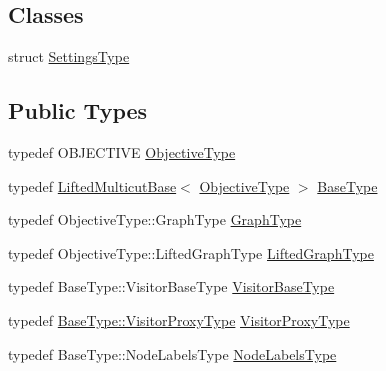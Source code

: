 \subsection*{Classes}
\begin{DoxyCompactItemize}
\item 
struct \hyperlink{structnifty_1_1graph_1_1opt_1_1lifted__multicut_1_1LiftedMulticutAndresGreedyAdditive_1_1SettingsType}{Settings\+Type}
\end{DoxyCompactItemize}
\subsection*{Public Types}
\begin{DoxyCompactItemize}
\item 
typedef O\+B\+J\+E\+C\+T\+I\+VE \hyperlink{classnifty_1_1graph_1_1opt_1_1lifted__multicut_1_1LiftedMulticutAndresGreedyAdditive_a17071365067415acd658d848f37f361a}{Objective\+Type}
\item 
typedef \hyperlink{classnifty_1_1graph_1_1opt_1_1lifted__multicut_1_1LiftedMulticutBase}{Lifted\+Multicut\+Base}$<$ \hyperlink{classnifty_1_1graph_1_1opt_1_1lifted__multicut_1_1LiftedMulticutAndresGreedyAdditive_a17071365067415acd658d848f37f361a}{Objective\+Type} $>$ \hyperlink{classnifty_1_1graph_1_1opt_1_1lifted__multicut_1_1LiftedMulticutAndresGreedyAdditive_ae2994c90119318204fc5aa7aa6421e0d}{Base\+Type}
\item 
typedef Objective\+Type\+::\+Graph\+Type \hyperlink{classnifty_1_1graph_1_1opt_1_1lifted__multicut_1_1LiftedMulticutAndresGreedyAdditive_ad623734a6fd0e6fcebdd84d8764003ce}{Graph\+Type}
\item 
typedef Objective\+Type\+::\+Lifted\+Graph\+Type \hyperlink{classnifty_1_1graph_1_1opt_1_1lifted__multicut_1_1LiftedMulticutAndresGreedyAdditive_afbbf999f5df5dfc1ed3cd8f3f296bf18}{Lifted\+Graph\+Type}
\item 
typedef Base\+Type\+::\+Visitor\+Base\+Type \hyperlink{classnifty_1_1graph_1_1opt_1_1lifted__multicut_1_1LiftedMulticutAndresGreedyAdditive_aaec5054a53fdbf048b7e2b63959db03e}{Visitor\+Base\+Type}
\item 
typedef \hyperlink{classnifty_1_1graph_1_1opt_1_1common_1_1SolverBase_ad209b469b3bc9fc0fc14e9fed4d09075}{Base\+Type\+::\+Visitor\+Proxy\+Type} \hyperlink{classnifty_1_1graph_1_1opt_1_1lifted__multicut_1_1LiftedMulticutAndresGreedyAdditive_a6b35ea13bacfe0442cc6bcca83517c7c}{Visitor\+Proxy\+Type}
\item 
typedef Base\+Type\+::\+Node\+Labels\+Type \hyperlink{classnifty_1_1graph_1_1opt_1_1lifted__multicut_1_1LiftedMulticutAndresGreedyAdditive_ae5dcc77ffcf6364667033052f43327e8}{Node\+Labels\+Type}
\end{DoxyCompactItemize}
